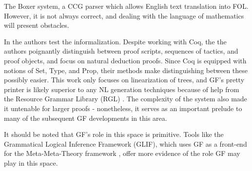 The Boxer system, a CCG parser \cite{bos-etal-2004-wide} which allows English
text translation into FOL. However, it is not always correct, and dealing with
the language of mathematics will present obstacles. 

In \cite{proofFrom} the authors test the informalization. Despite working with
Coq, the the authors poignantly distinguish between proof scripts, sequences of
tactics, and proof objects, and focus on natural deduction proofs. Since Coq is
equipped with notions of Set, Type, and Prop, their methods make distinguishing
between these possibly easier. This work only focuses on linearization of trees,
and GF's pretty printer is likely superior to any NL generation techniques
because of help from the Resource Grammar Library (RGL) \cite{ranta2009rgl}. The
complexity of the system also made it untenable for larger proofs - nonetheless,
it serves as an important prelude to many of the subsequent GF developments in
this area.

It should be noted that GF's role in this space is primitive. Tools like the
Grammatical Logical Inference Framework (GLIF), which uses GF as a front-end for
the Meta-Meta-Theory framework \cite{schaefer2020glif}, offer more evidence of
the role GF may play in this space.
